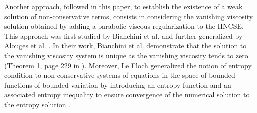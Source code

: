Another approach, followed in this paper, to establish the existence of a weak solution of non-conservative terms,
consists in considering the vanishing viscosity solution obtained by adding a parabolic viscous regularization to the HNCSE.
This approach was first studied by Bianchini et al. \cite{bianchini_bressan_2005} and 
further generalized by Alouges et al. \cite{alouges_merlet_2004}. In their work, Bianchini et al. demonstrate that the solution to the 
vanishing viscosity system is unique as the vanishing viscosity tends to zero (Theorem 1, page 229 in \cite{bianchini_bressan_2005}). 
Moreover, Le Floch generalized the notion of entropy condition to non-conservative systems of equations in the space of 
bounded functions of bounded variation  by introducing an entropy function and an associated entropy inequality to ensure convergence of the 
numerical solution to the entropy solution \cite{lefloch_1988}.

